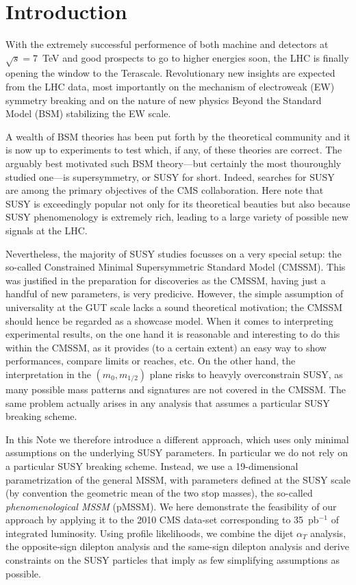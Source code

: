 \section{Introduction}
\label{sec:intro}

With the extremely successful performence of both machine and detectors
at $\sqrt{s}=7$~TeV and good prospects to go to higher energies soon, 
the LHC is finally opening the window to the Terascale. 
Revolutionary new insights are expected from the LHC data, most importantly 
on the mechanism of electroweak (EW) symmetry breaking and on the nature 
of new physics Beyond the Standard Model (BSM) stabilizing the EW scale. 

A wealth of BSM theories has been put forth by the theoretical community 
and it is now up to experiments to test which, if any, of these theories 
are correct. 
The arguably best motivated such BSM theory---but certainly the most 
thouroughly studied one---is supersymmetry, or SUSY for short. 
Indeed, searches for SUSY are among the primary objectives of the 
CMS collaboration. Here note that SUSY is exceedingly popular not 
only for its theoretical beauties but also because SUSY phenomenology 
is extremely rich, 
leading to a large variety of possible new signals at the LHC. 

Nevertheless, the majority of SUSY studies focusses on a very special 
setup: the so-called Constrained Minimal Supersymmetric Standard Model (CMSSM). 
This was justified in the preparation for discoveries as the CMSSM, 
having just a handful of new parameters, is very predicive. However, 
the simple assumption of universality at the GUT scale lacks a sound 
theoretical motivation; the CMSSM should hence be regarded as a showcase 
model. When it comes to interpreting experimental results, on the 
one hand it is reasonable and interesting to do this within the CMSSM, 
as it provides (to a certain extent) an easy way to show performances, 
compare limits or reaches, etc. On the other hand, the interpretation in the 
$(m_0,m_{1/2})$ plane risks to heavyly overconstrain SUSY, as many 
possible mass patterns and signatures are not covered in the CMSSM. 
The same problem actually arises in any analysis that assumes a particular 
SUSY breaking scheme. 

In this Note we therefore introduce a different approach, which uses only 
minimal assumptions on the underlying SUSY parameters. In particular we do 
not rely on a particular SUSY breaking scheme. Instead, we use a 19-dimensional 
parametrization of the general MSSM, with parameters defined at the SUSY scale 
(by convention the geometric mean of the two stop masses), 
the so-called \emph{phenomenological MSSM} (pMSSM). 
We here demonstrate the feasibility of our approach by applying it to 
the 2010 CMS data-set corresponding to 35~pb$^{-1}$ of integrated luminosity.  
Using profile likelihoods, we combine 
the dijet $\alpha_T$ analysis, the opposite-sign dilepton 
analysis and the same-sign dilepton analysis and derive constraints 
on the SUSY particles that imply as few simplifying assumptions as possible.

